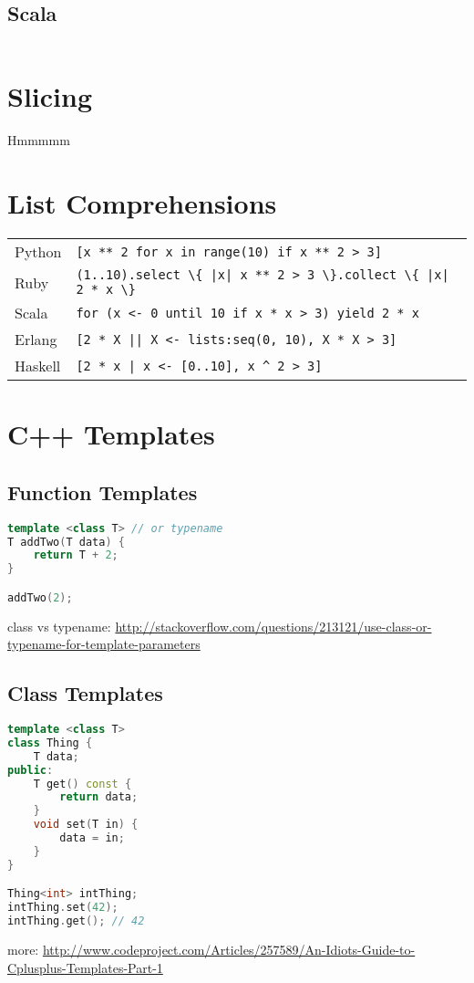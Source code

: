 \documentclass{article}
\begin{document}
\subsection{Scala}
\begin{lstlisting}

\end{lstlisting}

\section{Slicing}
Hmmmmm

\section{List Comprehensions}
\begin{longtabu} to 0.75\linewidth { X X }
	Python & \lstinline$[x ** 2 for x in range(10) if x ** 2 > 3]$ \\
	Ruby & \lstinline$(1..10).select \{ |x| x ** 2 > 3 \}.collect \{ |x| 2 * x \}$ \\
	Scala & \lstinline$for (x <- 0 until 10 if x * x > 3) yield 2 * x$ \\
	Erlang & \lstinline$[2 * X || X <- lists:seq(0, 10), X * X > 3]$ \\
	Haskell & \lstinline$[2 * x | x <- [0..10], x ^ 2 > 3]$ \\
\end{longtabu}

\section{C++ Templates}
\subsection{Function Templates}
\begin{lstlisting}[language=C++]
template <class T> // or typename
T addTwo(T data) {
	return T + 2;
}

addTwo(2);
\end{lstlisting}
class vs typename: \url{http://stackoverflow.com/questions/213121/use-class-or-typename-for-template-parameters}
\subsection{Class Templates}
\begin{lstlisting}[language=C++]
template <class T>
class Thing {
	T data;
public:
	T get() const {
		return data;
	}
	void set(T in) {
		data = in;
	}
}

Thing<int> intThing;
intThing.set(42);
intThing.get(); // 42
\end{lstlisting}
more: \url{http://www.codeproject.com/Articles/257589/An-Idiots-Guide-to-Cplusplus-Templates-Part-1}
\end{document}
